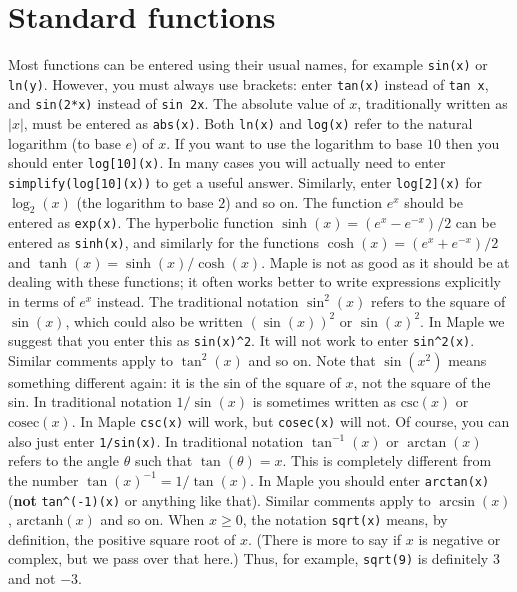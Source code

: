 \documentclass{amsart}
\begin{document}
\section{Standard functions}
\setcounter{notecounter}{0}


\begin{itemize}
%
  Most functions can be entered using their
  usual names, for example \verb~sin(x)~ or \verb~ln(y)~. 
%
  However, you must always use brackets: enter
  \verb~tan(x)~ instead of \verb~tan x~, and \verb~sin(2*x)~
  instead of \verb~sin 2x~. 
%
  The absolute value of $x$, traditionally written as
  $|x|$, must be entered as \verb~abs(x)~. 
%
  Both \verb~ln(x)~ and \verb~log(x)~ refer to the natural
  logarithm (to base $e$) of $x$. 
%
  If you want to use the logarithm to base $10$ then you
  should enter \verb~log[10](x)~.  In many cases 
  you will actually need to enter \verb~simplify(log[10](x))~ to get
  a useful answer.  Similarly, enter \verb~log[2](x)~ for
  $\log_2(x)$ (the logarithm to base $2$) and so on. 
%
  The function $e^x$ should be entered as \verb~exp(x)~. 
%
  The hyperbolic function $\sinh(x)=(e^x-e^{-x})/2$ can be
  entered as \verb~sinh(x)~, and similarly for the functions
  $\cosh(x)=(e^x+e^{-x})/2$ and $\tanh(x)=\sinh(x)/\cosh(x)$.  Maple
  is not as good as it should be at dealing with these functions; it
  often works better to write expressions explicitly in terms of $e^x$
  instead. 
%
  The traditional notation $\sin^2(x)$
  refers to the square of $\sin(x)$, which could also be
  written $(\sin(x))^2$ or $\sin(x)^2$.  In Maple we suggest
  that you enter this as \verb~sin(x)^2~.  It will 
  not work to enter \verb~sin^2(x)~.  Similar comments apply to
  $\tan^2(x)$ and so on.  Note that $\sin(x^2)$ means something
  different again: it is the sin of the square of $x$, not the square
  of the sin. 
%
  In traditional notation $1/\sin(x)$ is sometimes written as
  $\text{csc}(x)$ or $\text{cosec}(x)$.  In Maple \verb~csc(x)~ will
  work, but \verb~cosec(x)~ will not.  Of course, you can also just
  enter \verb~1/sin(x)~. 
%
  In traditional notation $\tan^{-1}(x)$ or $\arctan(x)$ refers
  to the angle $\theta$ such that $\tan(\theta)=x$.  This is
  completely different from the number $\tan(x)^{-1}=1/\tan(x)$.  In
  Maple you should enter \verb~arctan(x)~ (\textbf{not}
  \verb~tan^(-1)(x)~ or anything like that).  Similar comments apply
  to $\arcsin(x)$, $\text{arctanh}(x)$ and so on. 
%
  When $x\geq 0$, the notation \verb~sqrt(x)~ means, by
  definition, the positive square root of $x$.  (There is more to say
  if $x$ is negative or complex, but we pass over that here.)  Thus,
  for example, \verb~sqrt(9)~ is definitely $3$ and not $-3$.  
\end{itemize}
\end{document}
